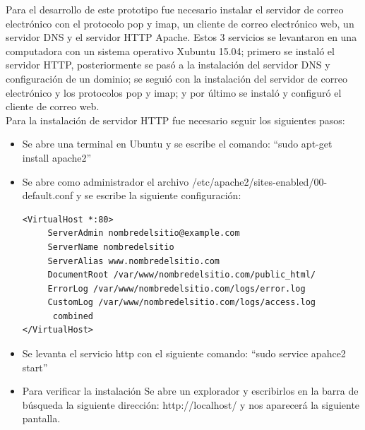 Para el desarrollo de este prototipo fue necesario instalar el servidor de correo electrónico con el protocolo pop y imap, un cliente de correo electrónico web, un servidor DNS y el servidor HTTP Apache. Estos 3 servicios se levantaron en una computadora con un sistema operativo Xubuntu 15.04; primero se instaló el servidor HTTP\cite{HTTP}, posteriormente se pasó a la instalación del servidor DNS y configuración de un dominio\cite{DNS}; se seguió con la instalación del servidor de correo electrónico y los protocolos pop y imap; y por último se instaló y  configuró el cliente de correo web\cite{web}.\\
Para la instalación de servidor HTTP fue necesario seguir los siguientes pasos:\
\begin{itemize}
 \item Se abre una terminal en Ubuntu y se escribe el comando: “sudo apt-get install apache2”
 \item Se abre como administrador el archivo /etc/apache2/sites-enabled/00-default.conf y se escribe la siguiente configuración:
 \begin{lstlisting}[frame=single]
  <VirtualHost *:80>
     ServerAdmin nombredelsitio@example.com
     ServerName nombredelsitio
     ServerAlias www.nombredelsitio.com
     DocumentRoot /var/www/nombredelsitio.com/public_html/
     ErrorLog /var/www/nombredelsitio.com/logs/error.log
     CustomLog /var/www/nombredelsitio.com/logs/access.log
      combined
</VirtualHost>
 \end{lstlisting}
 \item Se levanta el servicio http con el siguiente comando: “sudo service apahce2 start”
 \item Para verificar la instalación Se abre un explorador y escribirlos en la barra de búsqueda la siguiente dirección: http://localhost/ y nos aparecerá la siguiente pantalla.
\end{itemize}


